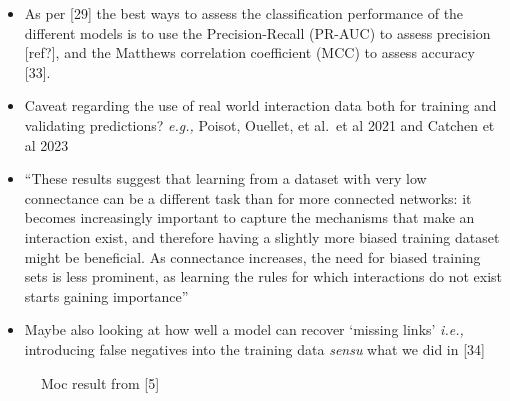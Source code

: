 \documentclass[
]{article}
\begin{document}
\begin{itemize}
\item
  As per {[}29{]} the best ways to assess the classification performance
  of the different models is to use the Precision-Recall (PR-AUC) to
  assess precision {[}ref?{]}, and the Matthews correlation coefficient
  (MCC) to assess accuracy {[}33{]}.
\item
  Caveat regarding the use of real world interaction data both for
  training and validating predictions? \emph{e.g.,} Poisot, Ouellet, et
  al.~et al 2021 and Catchen et al 2023
\item
  ``These results suggest that learning from a dataset with very low
  connectance can be a different task than for more connected networks:
  it becomes increasingly important to capture the mechanisms that make
  an interaction exist, and therefore having a slightly more biased
  training dataset might be beneficial. As connectance increases, the
  need for biased training sets is less prominent, as learning the rules
  for which interactions do not exist starts gaining importance''
\item
  Maybe also looking at how well a model can recover `missing links'
  \emph{i.e.,} introducing false negatives into the training data
  \emph{sensu} what we did in {[}34{]}
\end{itemize}

\begin{figure}


\caption{\label{fig-pichler}Moc result from {[}5{]}}

\end{figure}%
\end{document}
